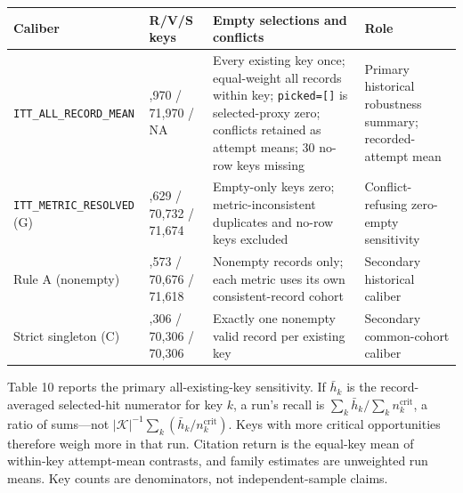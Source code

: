 \documentclass[
  11pt]{article}
\begin{document}
\begin{longtable}[]{@{}
  >{\raggedright\arraybackslash}p{}
  >{\raggedright\arraybackslash}p{}
  >{\raggedright\arraybackslash}p{}
  >{\raggedright\arraybackslash}p{}@{}}
\toprule\noalign{}
\begin{minipage}[b]{\linewidth}\raggedright
Caliber
\end{minipage} & \begin{minipage}[b]{\linewidth}\raggedright
R/V/S keys
\end{minipage} & \begin{minipage}[b]{\linewidth}\raggedright
Empty selections and conflicts
\end{minipage} & \begin{minipage}[b]{\linewidth}\raggedright
Role
\end{minipage} \\
\midrule\noalign{}
\endhead
\bottomrule\noalign{}
\endlastfoot
\texttt{ITT\_ALL\_RECORD\_MEAN} & 71,970 / 71,970 / NA & Every existing
key once; equal-weight all records within key; \texttt{picked={[}{]}} is
selected-proxy zero; conflicts retained as attempt means; 30 no-row keys
missing & Primary historical robustness summary; recorded-attempt
mean \\
\texttt{ITT\_METRIC\_RESOLVED} (G) & 71,629 / 70,732 / 71,674 &
Empty-only keys zero; metric-inconsistent duplicates and no-row keys
excluded & Conflict-refusing zero-empty sensitivity \\
Rule A (nonempty) & 71,573 / 70,676 / 71,618 & Nonempty records only;
each metric uses its own consistent-record cohort & Secondary historical
caliber \\
Strict singleton (C) & 70,306 / 70,306 / 70,306 & Exactly one nonempty
valid record per existing key & Secondary common-cohort caliber \\
\end{longtable}

Table 10 reports the primary all-existing-key sensitivity. If
\(\bar h_k\) is the record-averaged selected-hit numerator for key
\(k\), a run's recall is \(\sum_k\bar h_k/\sum_k n^{\mathrm{crit}}_k\),
a ratio of sums---not
\(|\mathcal K|^{-1}\sum_k(\bar h_k/n^{\mathrm{crit}}_k)\). Keys with
more critical opportunities therefore weigh more in that run. Citation
return is the equal-key mean of within-key attempt-mean contrasts, and
family estimates are unweighted run means. Key counts are denominators,
not independent-sample claims.
\end{document}
